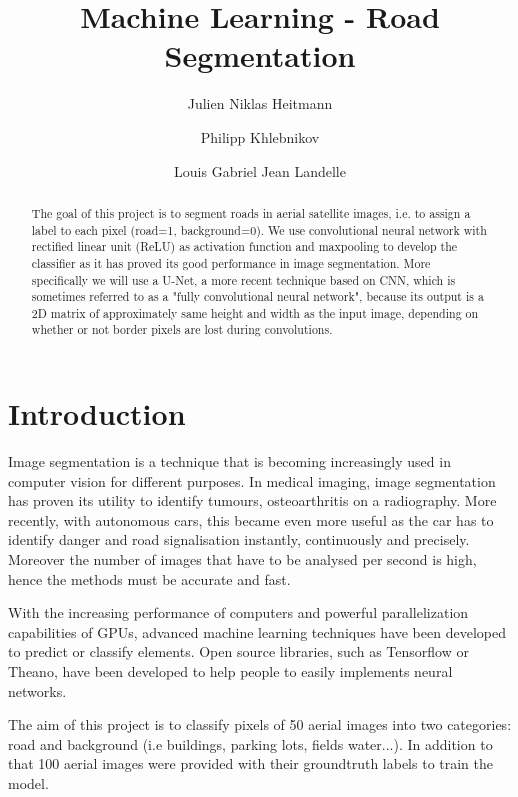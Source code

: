 \documentclass[10pt,conference,compsocconf]{IEEEtran}
\begin{document}
\title{Machine Learning - Road Segmentation}

\author{
  Julien Niklas Heitmann
  \and
  Philipp Khlebnikov
  \and
  Louis Gabriel Jean Landelle
} 

\maketitle

\begin{abstract}
The goal of this project is to segment roads in aerial satellite images, i.e. to assign a label to each pixel (road=1, background=0). We use convolutional neural network  with rectified linear unit (ReLU) as activation function and maxpooling to develop the classifier as it has proved its good performance in image segmentation. More specifically we will use a U-Net, a more recent technique based on CNN, which is sometimes referred to as a "fully convolutional neural network", because its output is a 2D matrix of approximately same height and width as the input image, depending on whether or not border pixels are lost during convolutions. 
\end{abstract}

\section{Introduction}

Image segmentation is a technique that is becoming increasingly used in computer vision for different purposes. In medical imaging, image segmentation has proven its utility to identify tumours, osteoarthritis on a radiography. More recently, with autonomous cars, this became even more useful as the car has to identify danger and road signalisation instantly, continuously and precisely. Moreover the number of images that have to be analysed per second is high, hence the methods must be accurate and fast.

With the increasing performance of computers and powerful parallelization capabilities of GPUs, advanced machine learning techniques have been developed to predict or classify elements. Open source libraries, such as Tensorflow or Theano, have been developed to help people to easily implements neural networks.

The aim of this project is to classify pixels of 50 aerial images into two categories: road and background (i.e buildings, parking lots, fields water...). In addition to that 100 aerial images were provided with their groundtruth labels to train the model.
\end{document}

